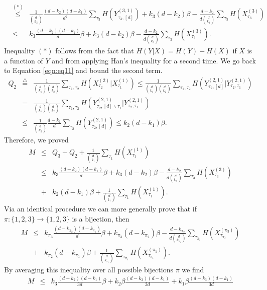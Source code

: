 \documentclass[journal,onecolumn,draftcls]{IEEEtran}
\begin{document}
\begin{IEEEproof}
\begin{eqnarray*}
 &\stackrel{(*)}{\le}& \frac{1}{{d \choose k_3}} \frac{(d-k_2)(d-k_1)}{d^2}\sum_{\tau_3}H(Y^{(3,1)}_{\tau_3,[d]})+ k_3(d-k_2)\beta - \frac{d-k_2}{d{d\choose k_3}}\sum_{\tau_3}H(X^{(3)}_{\tau_3})\\
 &\le& k_3\frac{(d-k_2)(d-k_1)}{d}\beta + k_3(d-k_2)\beta -\frac{d-k_2}{d{d\choose k_3}}\sum_{\tau_3}H(X^{(3)}_{\tau_3}) .
\end{eqnarray*}
Inequality $(*)$ follows from the fact that $H(Y|X) = H(Y) - H(X)$ if $X$ is a function of $Y$ and from applying Han's inequality for a second time. We go back to Equation \eqref{eqn:eq11} and bound the second term.
\begin{eqnarray*}
Q_2 &\stackrel{\triangle}{=}&\frac{1}{{d \choose k_1}{d \choose k_2}}\sum_{{\tau_1,\tau_2}}H(X^{(2)}_{\tau_2}|X^{(1)}_{\tau_1}) \le \frac{1}{{d \choose k_1}{d \choose k_2}}\sum_{{\tau_1,\tau_2}}H(Y^{(2,1)}_{\tau_2,[d]}|Y^{(2,1)}_{\tau_2,\tau_1})\\
&=&\frac{1}{{d \choose k_1}{d \choose k_2}}\sum_{{\tau_1,\tau_2}}H(Y^{(2,1)}_{\tau_2,[d]\backslash{\tau_1}}|Y^{(2,1)}_{\tau_2,\tau_1})\\
&\le& \frac{1}{{d \choose k_2}}\frac{d-k_1}{d}\sum_{\tau_2}H(Y^{(2,1)}_{\tau_2,[d]})\le k_2(d-k_1)\beta.
\end{eqnarray*}
Therefore, we proved
\begin{eqnarray*}
M&\le& Q_3 + Q_2 + \frac{1}{{d \choose k_1}}\sum_{{\tau_1}}H(X^{(1)}_{\tau_1}) \\
&\le& k_3\frac{(d-k_2)(d-k_1)}{d}\beta +k_3(d-k_2)\beta-\frac{d-k_2}{d{d\choose k_3}}\sum_{\tau_3}H(X^{(3)}_{\tau_3})\\ &+& k_2(d-k_1)\beta + \frac{1}{{d \choose k_1}}\sum_{\tau_1}H(X^{(1)}_{\tau_1}).
\end{eqnarray*}
Via an identical procedure we can more generally prove that if $\pi:\{1,2,3\}\rightarrow\{1,2,3\}$ is a bijection, then
\begin{eqnarray*}
M&\le& k_{\pi_3}\frac{(d-k_{\pi_2})(d-k_{\pi_1})}{d}\beta +k_{\pi_3}(d-k_{\pi_2})\beta-\frac{d-k_{\pi_2}}{d{d\choose k_{\pi_3}}}\sum_{\tau_{\pi_3}}H(X^{(\pi_3)}_{\tau_{\pi_3}}) \\&+& k_{\pi_2}(d-k_{\pi_1})\beta + \frac{1}{{d \choose k_{\pi_1}}}\sum_{\tau_{\pi_1}}H(X^{({\pi_1})}_{\tau_{\pi_1}}).
\end{eqnarray*}
By averaging this inequality over all possible bijections $\pi$ we find
\begin{eqnarray*}
M&\le& k_3\frac{(d-k_2)(d-k_1)}{3d}\beta  + k_2\beta\frac{(d-k_3)(d-k_1)}{3d} + k_1\beta\frac{(d-k_3)(d-k_1)}{3d} \nonumber\\

\end{eqnarray*}
\end{IEEEproof}
\end{document}
